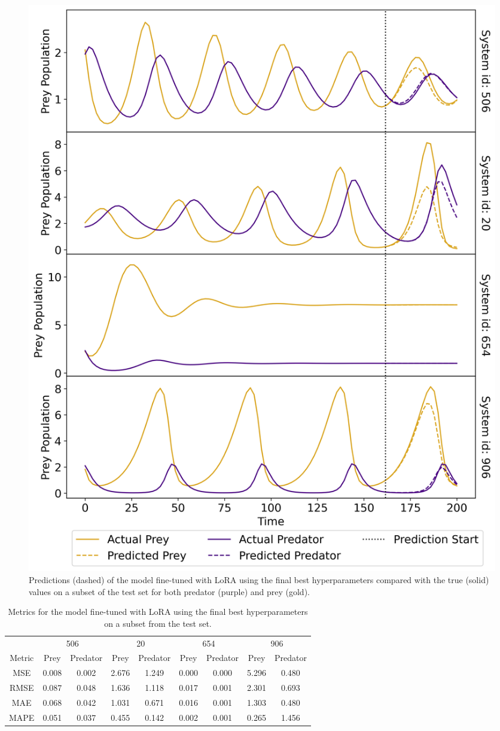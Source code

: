 \documentclass[11pt,a4paper]{article}
\begin{document}
\begin{figure}
    \centering
    \includegraphics[width=\columnwidth, keepaspectratio]{../plots/predictions_lora_final.png}
    \caption{Predictions (dashed) of the model fine-tuned with LoRA using the final best hyperparameters compared with the true (solid) values on a subset of the test set for both predator (purple) and prey (gold).}\label{fig:lora_final_pred}
\end{figure}

\begin{table}
    \centering
    \begin{tabular}{c|c|c|c|c|c|c|c|c}
        & \multicolumn{2}{c|}{506} & \multicolumn{2}{c|}{20} & \multicolumn{2}{c|}{654} & \multicolumn{2}{|c}{906} \\
        Metric & Prey & Predator & Prey & Predator & Prey & Predator & Prey & Predator \\
        \hline
        MSE & 0.008 & 0.002 & 2.676 & 1.249 & 0.000 & 0.000 & 5.296 & 0.480 \\
        RMSE & 0.087 & 0.048 & 1.636 & 1.118 & 0.017 & 0.001 & 2.301 & 0.693 \\
        MAE & 0.068 & 0.042 & 1.031 & 0.671 & 0.016 & 0.001 & 1.303 & 0.480 \\
        MAPE & 0.051 & 0.037 & 0.455 & 0.142 & 0.002 & 0.001 & 0.265 & 1.456 \\        
    \end{tabular}
    \caption{Metrics for the model fine-tuned with LoRA using the final best hyperparameters on a subset from the test set.}
    \label{tab:lora_final_metrics}
\end{table}
\end{document}
